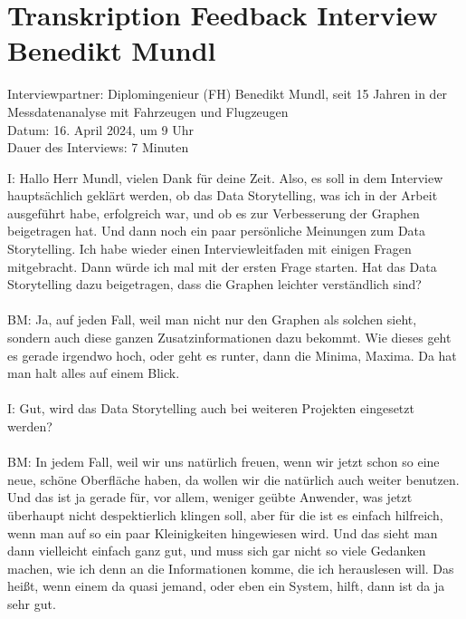 \section{Transkription Feedback Interview Benedikt Mundl} 
\label{appendix:interview_ende_mundl}
Interviewpartner: Diplomingenieur (FH) Benedikt Mundl, seit 15 Jahren in der Messdatenanalyse mit Fahrzeugen und Flugzeugen\\
Datum: 16. April 2024, um 9 Uhr\\
Dauer des Interviews: 7 Minuten\\

\begin{linenumbers}
\noindent
I: Hallo Herr Mundl, vielen Dank für deine Zeit. Also, es soll in dem Interview hauptsächlich geklärt werden, ob das Data Storytelling, was ich in der Arbeit ausgeführt habe, erfolgreich war, und ob es zur Verbesserung der Graphen beigetragen hat. Und dann noch ein paar persönliche Meinungen zum Data Storytelling. Ich habe wieder einen Interviewleitfaden mit einigen Fragen mitgebracht. Dann würde ich mal mit der ersten Frage starten. Hat das Data Storytelling dazu beigetragen, dass die Graphen leichter verständlich sind?\\\\
BM: Ja, auf jeden Fall, weil man nicht nur den Graphen als solchen sieht, sondern auch diese ganzen Zusatzinformationen dazu bekommt. Wie dieses geht es gerade irgendwo hoch, oder geht es runter, dann die Minima, Maxima. Da hat man halt alles auf einem Blick. \\\\
I: Gut, wird das Data Storytelling auch bei weiteren Projekten eingesetzt werden?\\\\
BM: In jedem Fall, weil wir uns natürlich freuen, wenn wir jetzt schon so eine neue, schöne Oberfläche haben, da wollen wir die natürlich auch weiter benutzen. Und das ist ja gerade für, vor allem, weniger geübte Anwender, was jetzt überhaupt nicht despektierlich klingen soll, aber für die ist es einfach hilfreich, wenn man auf so ein paar Kleinigkeiten hingewiesen wird. Und das sieht man dann vielleicht einfach ganz gut, und muss sich gar nicht so viele Gedanken machen, wie ich denn an die Informationen komme, die ich herauslesen will. Das heißt, wenn einem da quasi jemand, oder eben ein System, hilft, dann ist da ja sehr gut.\\\\

\end{linenumbers}
